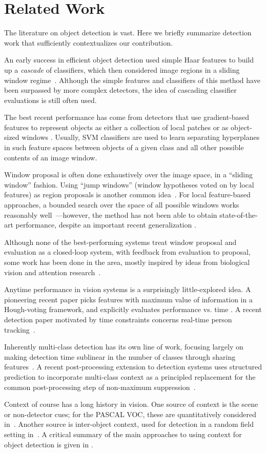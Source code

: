 \section{Related Work}
The literature on object detection is vast.
Here we briefly summarize detection work that sufficiently contextualizes our contribution.

An early success in efficient object detection used simple Haar features to build up a \emph{cascade} of classifiers, which then considered image regions in a sliding window regime~\cite{Viola2001}.
Although the simple features and classifiers of this method have been surpassed by more complex detectors, the idea of cascading classifier evaluations is still often used.

The best recent performance has come from detectors that use gradient-based features to represent objects as either a collection of local patches or as object-sized windows \cite{Dalal2005,Lowe2004}.
Usually, SVM classifiers are used to learn separating hyperplanes in such feature spaces between objects of a given class and all other possible contents of an image window.

Window proposal is often done exhaustively over the image space, in a ``sliding window'' fashion.
Using ``jump windows'' (window hypotheses voted on by local features) as region proposals is another common idea~\cite{Chum2007b,Vedaldi2009,Vijayanarasimhan2011}.
For local feature-based approaches, a bounded search over the space of all possible windows works reasonably well~\cite{Lampert2008b}---however, the method has not been able to obtain state-of-the-art performance, despite an important recent generalization \cite{Lehmann2011a}.

Although none of the best-performing systems treat window proposal and evaluation as a closed-loop system, with feedback from evaluation to proposal, some work has been done in the area, mostly inspired by ideas from biological vision and attention research~\cite{Butko2009,Vogel2008,Paletta2005}.

Anytime performance in vision systems is a surprisingly little-explored idea.
A pioneering recent paper picks features with maximum value of information in a Hough-voting framework, and explicitly evaluates performance vs. time \cite{Vijayanarasimhan2010}.
A recent detection paper motivated by time constraints concerns real-time person tracking~\cite{Mitzel2011b}.

Inherently multi-class detection has its own line of work, focusing largely on making detection time sublinear in the number of classes through sharing features~\cite{Torralba2007,Fan2005,Razavi2011}.
A recent post-processing extension to detection systems uses structured prediction to incorporate multi-class context as a principled replacement for the common post-processing step of non-maximum suppression~\cite{Desai2009}.

Context of course has a long history in vision.
One source of context is the scene or non-detector cues; for the PASCAL VOC, these are quantitatively considered in~\cite{Divvala2009}.
Another source is inter-object context, used for detection in a random field setting in~\cite{Torralba2004}.
A critical summary of the main approaches to using context for object detection is given in \cite{Galleguillos2010}.
